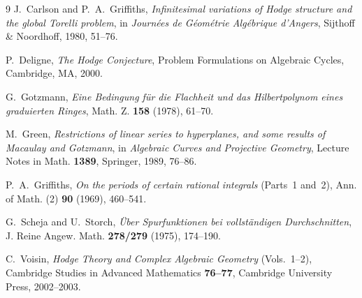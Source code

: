 \documentclass[11pt,a4paper]{article}
\begin{document}
\begin{thebibliography}{9}
J.~Carlson and P.~A.~Griffiths, \emph{Infinitesimal variations of Hodge structure and the global Torelli problem}, in \emph{Journ\'ees de G\'eom\'etrie Alg\'ebrique d'Angers}, Sijthoff \& Noordhoff, 1980, 51--76.

P.~Deligne, \emph{The Hodge Conjecture}, Problem Formulations on Algebraic Cycles, Cambridge, MA, 2000.

G.~Gotzmann, \emph{Eine Bedingung f\"ur die Flachheit und das Hilbertpolynom eines graduierten Ringes}, Math. Z. \textbf{158} (1978), 61--70.

M.~Green, \emph{Restrictions of linear series to hyperplanes, and some results of Macaulay and Gotzmann}, in \emph{Algebraic Curves and Projective Geometry}, Lecture Notes in Math. \textbf{1389}, Springer, 1989, 76--86.

P.~A.~Griffiths, \emph{On the periods of certain rational integrals} (Parts~1 and~2), Ann. of Math. (2) \textbf{90} (1969), 460--541.

G.~Scheja and U.~Storch, \emph{\"Uber Spurfunktionen bei vollst\"andigen Durchschnitten}, J. Reine Angew. Math. \textbf{278/279} (1975), 174--190.

C.~Voisin, \emph{Hodge Theory and Complex Algebraic Geometry} (Vols.~1--2), Cambridge Studies in Advanced Mathematics \textbf{76--77}, Cambridge University Press, 2002--2003.
\end{thebibliography}
\end{document}
